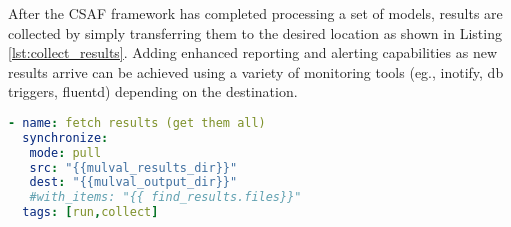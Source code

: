 After the CSAF framework has completed processing a set of models, results are collected by simply transferring them to the desired location as shown in Listing \ref{lst:collect_results}. Adding enhanced reporting and alerting capabilities as new results arrive can be achieved using a variety of monitoring tools (eg., inotify, db triggers, fluentd) depending on the destination.

\begin{minipage}{\linewidth}
\begin{lstlisting}[language=yaml, label={lst:collect_results}, caption={Collect Results},captionpos=b, linewidth=.6\textwidth]
- name: fetch results (get them all)
  synchronize:
   mode: pull
   src: "{{mulval_results_dir}}"
   dest: "{{mulval_output_dir}}"
   #with_items: "{{ find_results.files}}"
  tags: [run,collect]
\end{lstlisting}
\end{minipage}